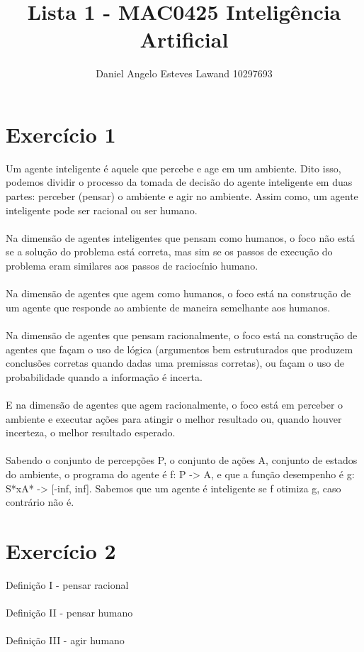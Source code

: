 \documentclass{article}
\title{\textbf{Lista 1 - MAC0425 Inteligência Artificial}}
\author{Daniel Angelo Esteves Lawand 10297693}
\begin{document}
\maketitle
\onehalfspacing
\section*{Exercício 1}

Um agente inteligente é aquele que percebe e age em um ambiente. Dito isso, podemos dividir o processo da tomada de decisão do agente inteligente em duas partes: perceber (pensar) o ambiente e agir no ambiente. Assim como, um agente inteligente pode ser racional ou ser humano.\\
\\
Na dimensão de agentes inteligentes que pensam como humanos, o foco não está se a solução do problema está correta, mas sim se os passos de execução do problema eram similares aos passos de raciocínio humano.\\
\\
Na dimensão de agentes que agem como humanos, o foco está na construção de um agente que responde ao ambiente de maneira semelhante aos humanos.\\
\\
Na dimensão de agentes que pensam racionalmente, o foco está na construção de agentes que façam o uso de lógica (argumentos bem estruturados que produzem conclusões corretas quando dadas uma premissas corretas), ou façam o uso de probabilidade quando a informação é incerta.\\
\\
E na dimensão de agentes que agem racionalmente, o foco está em perceber o ambiente e executar ações para atingir o melhor resultado ou, quando houver incerteza, o melhor resultado esperado.\\
\\
Sabendo o conjunto de percepções P, o conjunto de ações A, conjunto de estados do ambiente, o programa do agente é f: P -> A, e que a função desempenho é g: S*xA* -> [-inf, inf]. Sabemos que um agente é inteligente se f otimiza g, caso contrário não é.

\section*{Exercício 2}
Definição I - pensar racional\\
\\
Definição II - pensar humano\\
\\
Definição III - agir humano\\
\end{document}
